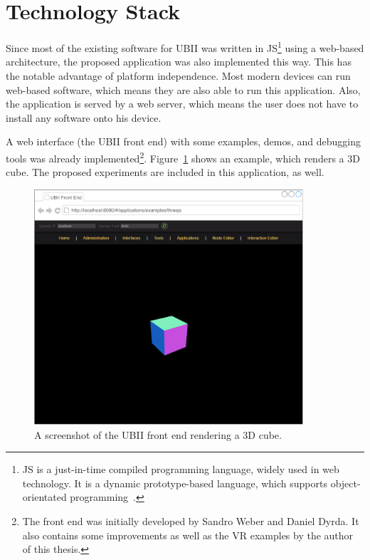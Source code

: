 \section{Technology Stack}\label{section:technology-stack}

Since most of the existing software for \ac{UBII} was written in \acf{JS}\footnote{\ac{JS} is a just-in-time compiled programming language, widely used in web technology. It is a dynamic prototype-based language, which supports object-orientated programming~\cite[43, 47]{ECMAInternational.2018}.} using a web-based architecture, the proposed application was also implemented this way. This has the notable advantage of platform independence. Most modern devices can run web-based software, which means they are also able to run this application. Also, the application is served by a web server, which means the user does not have to install any software onto his device.

A web interface (the \ac{UBII} front end) with some examples, demos, and debugging tools was already implemented\footnote{The front end was initially developed by Sandro Weber and Daniel Dyrda. It also contains some improvements as well as the \ac{VR} examples by the author of this thesis.}. Figure~\ref{fig:ubii-front-end} shows an example, which renders a \ac{3D} cube. The proposed experiments are included in this application, as well.

\begin{figure}[H]
	\centering
	\includegraphics[width=10cm]{figures/implementation/ubii_front_end.pdf}
	\caption[Screenshot of the UBII front end]{A screenshot of the UBII front end rendering a \ac{3D} cube.}\label{fig:ubii-front-end}
\end{figure}

